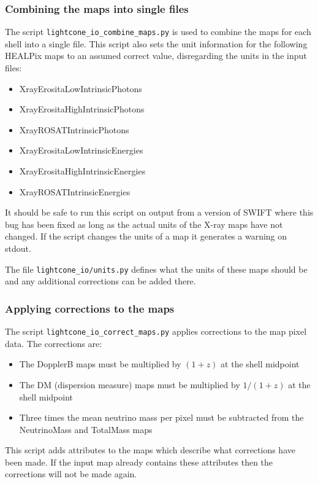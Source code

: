 \documentclass{article}
\begin{document}
\subsubsection{Combining the maps into single files}

The script \verb|lightcone_io_combine_maps.py| is used to combine the maps
for each shell into a single file. This script also sets the unit
information for the following HEALPix maps to an assumed correct
value, disregarding the units in the input files:

\begin{itemize}
\item{XrayErositaLowIntrinsicPhotons}
\item{XrayErositaHighIntrinsicPhotons}
\item{XrayROSATIntrinsicPhotons}
\item{XrayErositaLowIntrinsicEnergies}
\item{XrayErositaHighIntrinsicEnergies}
\item{XrayROSATIntrinsicEnergies}
\end{itemize}

It should be safe to run this script on output from a version of SWIFT
where this bug has been fixed as long as the actual units of the X-ray
maps have not changed. If the script changes the units of a map it
generates a warning on stdout.

The file \verb|lightcone_io/units.py| defines what the units of these maps
should be and any additional corrections can be added there.

\subsubsection{Applying corrections to the maps}

The script \verb|lightcone_io_correct_maps.py| applies corrections to the map
pixel data. The corrections are:
\begin{itemize}
\item{The DopplerB maps must be multiplied by $(1+z)$ at the shell
    midpoint}
\item{The DM (dispersion measure) maps must be multiplied by $1/(1+z)$
    at the shell midpoint}
\item{Three times the mean neutrino mass per pixel must be subtracted
    from the NeutrinoMass and TotalMass maps}
\end{itemize}

This script adds attributes to the maps which describe what
corrections have been made. If the input map already contains these
attributes then the corrections will not be made again.
\end{document}
